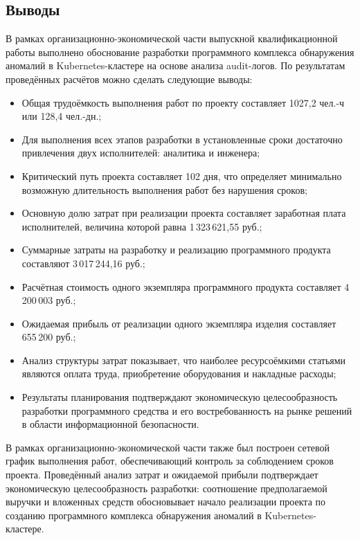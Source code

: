 \subsection{Выводы}

В рамках организационно-экономической части выпускной квалификационной работы выполнено обоснование разработки программного комплекса обнаружения аномалий в Kubernetes-кластере на основе анализа audit-логов. По результатам проведённых расчётов можно сделать следующие выводы:

\begin{itemize}
    \item Общая трудоёмкость выполнения работ по проекту составляет 1027,2 чел.-ч или 128,4 чел.-дн.;
    \item Для выполнения всех этапов разработки в установленные сроки достаточно привлечения двух исполнителей: аналитика и инженера;
    \item Критический путь проекта составляет 102 дня, что определяет минимально возможную длительность выполнения работ без нарушения сроков;
    \item Основную долю затрат при реализации проекта составляет заработная плата исполнителей, величина которой равна 1\,323\,621,55 руб.;
    \item Суммарные затраты на разработку и реализацию программного продукта составляют 3\,017\,244,16 руб.;
    \item Расчётная стоимость одного экземпляра программного продукта составляет 4\,200\,003 руб.;
    \item Ожидаемая прибыль от реализации одного экземпляра изделия составляет 655\,200 руб.;
    \item Анализ структуры затрат показывает, что наиболее ресурсоёмкими статьями являются оплата труда, приобретение оборудования и накладные расходы;
    \item Результаты планирования подтверждают экономическую целесообразность разработки программного средства и его востребованность на рынке решений в области информационной безопасности.
\end{itemize}

В рамках организационно-экономической части также был построен сетевой график выполнения работ, обеспечивающий контроль за соблюдением сроков проекта. Проведённый анализ затрат и ожидаемой прибыли подтверждает экономическую целесообразность разработки: соотношение предполагаемой выручки и вложенных средств обосновывает начало реализации проекта по созданию программного комплекса обнаружения аномалий в Kubernetes-кластере.